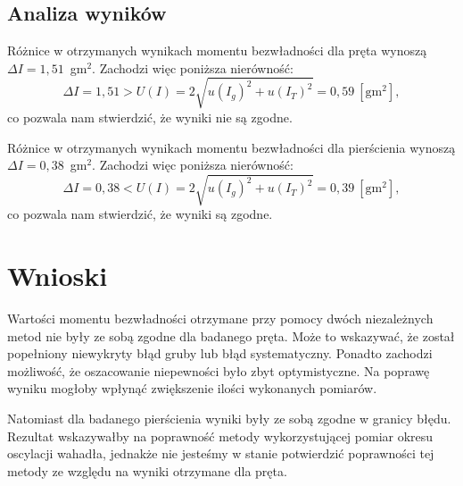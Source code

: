 \documentclass[12pt,a4paper]{article}
\numberwithin{equation}{section}
\begin{document}
\subsection{Analiza wyników}

Różnice w otrzymanych wynikach momentu bezwładności dla pręta wynoszą $\Delta I = 1,51$~gm$^2$.  Zachodzi więc poniższa nierówność:
\begin{equation}
	\Delta I = 1,51 > U(I) = 2\sqrt{u(I_g)^2 + u(I_T)^2} = 0,59 ~[\textrm{gm}^2],
\end{equation}
co pozwala nam stwierdzić, że wyniki nie są zgodne.

Różnice w otrzymanych wynikach momentu bezwładności dla pierścienia wynoszą $\Delta I = 0,38$~gm$^2$.  Zachodzi więc poniższa nierówność:
\begin{equation}
\Delta I = 0,38 < U(I) = 2\sqrt{u(I_g)^2 + u(I_T)^2} = 0,39 ~[\textrm{gm}^2],
\end{equation}
co pozwala nam stwierdzić, że wyniki są zgodne.

\pagebreak
\section{Wnioski}

Wartości momentu bezwładności otrzymane przy pomocy dwóch niezależnych metod nie były ze sobą zgodne dla badanego pręta. Może to wskazywać, że został popełniony niewykryty błąd gruby lub błąd systematyczny. Ponadto zachodzi możliwość, że oszacowanie niepewności było zbyt optymistyczne. Na poprawę wyniku mogłoby wpłynąć zwiększenie ilości wykonanych pomiarów.

Natomiast dla badanego pierścienia wyniki były ze sobą zgodne w granicy błędu. Rezultat wskazywałby na poprawność metody wykorzystującej pomiar okresu oscylacji wahadła, jednakże nie jesteśmy w stanie potwierdzić poprawności tej metody ze względu na wyniki otrzymane dla pręta.
\end{document}
